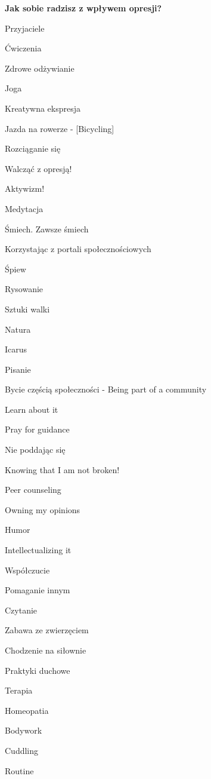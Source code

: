 \noindent\textcolor{ProcessBlue}{\textbf{\Large{Jak sobie radzisz z wpływem opresji?}}}\\
\begin{multicols}{2}
\begin{checkboxlist}
\item Przyjaciele
\item Ćwiczenia
\item Zdrowe odżywianie
\item Joga
\item Kreatywna ekspresja
\item Jazda na rowerze - [Bicycling]
\item Rozciąganie się
\item Walcząć z opresją!
\item Aktywizm!
\item Medytacja
\item Śmiech. Zawsze śmiech
\item Korzystając z portali społecznościowych
\item Śpiew
\item Rysowanie
\item Sztuki walki
\item Natura
\item Icarus
\item Pisanie
\item Bycie częścią społeczności - Being part of a community
\item Learn about it
\item Pray for guidance
\item Nie poddając się
\item Knowing that I am not broken!
\item Peer counseling
\item Owning my opinions
\item Humor
\item Intellectualizing it
\item Współczucie
\item Pomaganie innym
\item Czytanie
\item Zabawa ze zwierzęciem
\item Chodzenie na siłownie
\item Praktyki duchowe
\item Terapia
\item Homeopatia
\item Bodywork
\item Cuddling
\item Routine

\end{checkboxlist}
\end{multicols}
